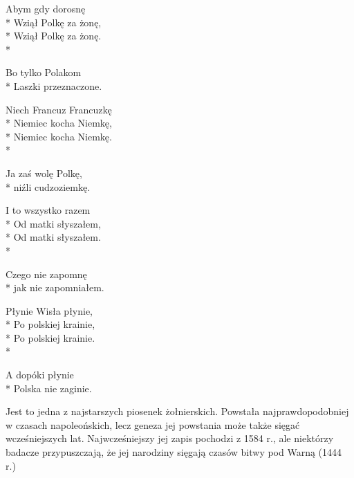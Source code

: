 \begin{lyrics}[multicol=true,longestline={,,Ojcze nasz'' i ,,Zdrowaś''}]
Abym gdy dorosnę\\*
Wziął Polkę za żonę,\\*
Wziął Polkę za żonę.\\*
\begin{markverses}[atwidthof={Zobaczyła Krakówmm}]%
Bo tylko Polakom\\*
Laszki przeznaczone.
\end{markverses}

Niech Francuz Francuzkę\\*
Niemiec kocha Niemkę,\\*
Niemiec kocha Niemkę.\\*
\begin{markverses}[atwidthof={Zobaczyła Krakówmm}]%
Ja zaś wolę Polkę,\\*
niźli cudzoziemkę.
\end{markverses}

I to wszystko razem\\*
Od matki słyszałem,\\*
Od matki słyszałem.\\*
\begin{markverses}[atwidthof={Zobaczyła Krakówmm}]%
Czego nie zapomnę\\*
jak nie zapomniałem.
\end{markverses}

Płynie Wisła płynie,\\*
Po polskiej krainie,\\*
Po polskiej krainie.\\*
\begin{markverses}[atwidthof={Zobaczyła Krakówmm}]%
A dopóki płynie\\*
Polska nie zaginie.
\end{markverses}
\end{lyrics}



\begin{info}Jest to jedna z najstarszych piosenek żołnierskich. Powstała najprawdopodobniej w czasach napoleońskich, lecz geneza jej powstania może także sięgać wcześniejszych lat. Najwcześniejszy jej zapis pochodzi z 1584 r., ale niektórzy badacze przypuszczają, że jej narodziny sięgają czasów bitwy pod Warną (1444 r.)\end{info}

